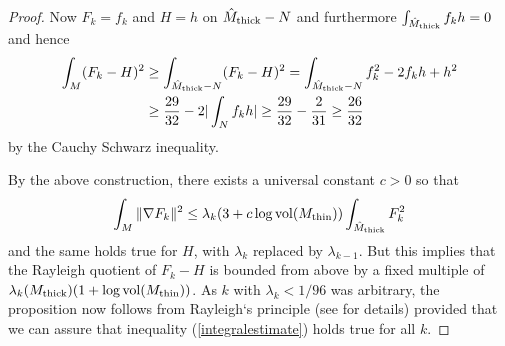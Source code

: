 \documentclass[11pt]{amsart}
\theoremstyle{plain}
\theoremstyle{plain}
\theoremstyle{definition}
\begin{document}
\begin{proof}
Now $F_k=f_k$ and $H=h$ on $\hat M_{\rm thick}-N$ and furthermore
$\int_{\hat M_{\rm thick}}f_kh=0$ and hence
\begin{align}\label{computation10}
\int_M (F_k-H)^2 &\geq \int_{\hat M_{\rm thick}-N}(F_k-H)^2
=\int_{\hat M_{\rm thick}-N}f_k^2-2f_kh+h^2\\
& \geq \frac{29}{32} -2 \vert \int_N f_kh \vert \geq 
\frac{29}{32}-\frac{2}{31} \geq \frac{26}{32}\notag
\end{align}
by the Cauchy Schwarz inequality. 

By the above construction, there exists a 
universal constant $c>0$ so that 
\[\int_M\Vert \nabla F_k\Vert^2\leq \lambda_k(3+
c\log {\rm vol}(M_{\rm thin}))\int_{\hat M_{\rm thick}} F_k^2\] 
and the same holds true for $H$, with $\lambda_k$ replaced by
$\lambda_{k-1}$. But this implies that 
the Rayleigh quotient of $F_k-H$ is bounded
from above by a fixed multiple of $\lambda_k(M_{\rm thick})(1+\log{\rm vol}(M_{\rm thin}))$.
As $k$ with $\lambda_k<1/96$ was arbitrary, 
the proposition now follows from Rayleigh`s principle
(see \cite{C84} for details) provided that we can assure that
inequality (\ref{integralestimate}) holds true for all $k$.

%
%





\end{proof}
\end{document}
